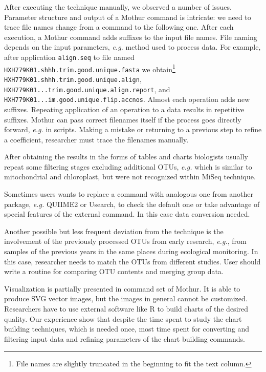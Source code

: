\documentclass[a4paper]{jpconf}
\begin{document}
After executing the technique manually, we observed a number of issues. Parameter structure and output of a Mothur command is intricate: we need to trace file names change from a command to the following one.  After each execution, a Mothur command adds suffixes to the input file names.  File naming depends on the input parameters, \emph{e.g.} method used to process data.  For example, after application \verb|align.seq| to file named \verb|HXH779K01.shhh.trim.good.unique.fasta| we obtain\footnote{File names are slightly truncated in the beginning to fit the text column.} \verb|HXH779K01.shhh.trim.good.unique.align|, \verb|HXH779K01...trim.good.unique.align.report|, and \verb|HXH779K01...im.good.unique.flip.accnos|.  Almost each operation adds new suffixes.  Repeating application of an operation to a data results in repetitive suffixes.  Mothur can pass correct filenames itself if the process goes directly forward, \emph{e.g.} in scripts.  Making a mistake or returning to a previous step to refine a coefficient, researcher must trace the filenames manually.

After obtaining the results in the forms of tables and charts biologists usually repeat some filtering stages excluding additional OTUs, \emph{e.g.} which is similar to mitochondrial and chloroplast, but were not recognized within MiSeq technique.

Sometimes users wants to replace a command with analogous one from another package, \emph{e.g.} QUIIME2 or Usearch, to check the default one or take advantage of special features of the external command. In this case data conversion needed.

Another possible but less frequent deviation from the technique is the involvement of the previously processed OTUs from early research, \emph{e.g.}, from samples of the previous years in the same places during ecological monitoring. In this case, researcher needs to match the OTUs from different studies. User should write a routine for comparing OTU contents and merging group data.

Visualization is partially presented in command set of Mothur.  It is able to produce SVG vector images, but the images in general cannot be customized.  Researchers have to use external software like R to build charts of the desired quality.  Our experience show that despite the time spent to study the chart building techniques, which is needed once, most time spent for converting and filtering input data and refining parameters of the chart building commands.
\end{document}
